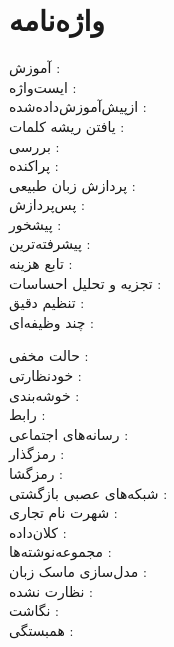 \chapter*{واژه‌نامه}
\begin{multicols}{2}
\small

آموزش : 
\\
ایست‌واژه : 
\\
از‌پیش‌آموزش‌داده‌شده : 
\\
یافتن ریشه کلمات : 
\\
بررسی : 
\\
پراکنده :‌
\\
پردازش زبان طبیعی : 
\\
پس‌پردازش : 
\\
پیشخور : 
\\
پیشرفته‌ترین : 
\\
تابع هزینه :‌
\\
تجزیه و تحلیل احساسات :  
\\
تنظیم دقیق : 
\\
چند وظیفه‌ای : 

حالت مخفی : 
\\

خودنظارتی : 
\\
خوشه‌بندی : 
\\


رابط : 
\\
رسانه‌های اجتماعی : 
\\
رمزگذار : 
\\
رمزگشا : 
\\
شبکه‌های عصبی بازگشتی :  
\\
شهرت نام تجاری : 
\\

کلان‌داده :‌
\\
مجموعه‌نوشته‌ها : 
\\
مدل‌سازی ماسک زبان :  
\\

نظارت نشده :‌
\\
نگاشت : 
\\
همبستگی : 
\\

\end{multicols}

\newpage